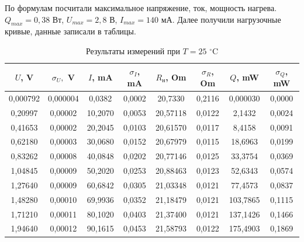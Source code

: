\documentclass[a4paper,12pt]{article}
\begin{document}
По формулам посчитали максимальное напряжение, ток, мощность нагрева. $Q_{max} = 0,38$ Вт, $U_{max} = 2,8$ В, $I_{max} = 140$ мА. Далее получили нагрузочные кривые, данные записали в таблицы.


\begin{table}[H]
    \centering
    \begin{tabular}{|c|c|c|c|c|c|c|c|}
    \hline
        $U$, V & $\sigma_U,$ V & $I$, mA & $\sigma_I$, mA & $R_н$, Om & $\sigma_R$, Om & $Q$, mW & $\sigma_Q$, mW \\ \hline
        0,000792 & 0,000004 & 0,0382 & 0,0002 & 20,7330 & 0,2116 & 0,000030 & 0,0000 \\ \hline
        0,20997 & 0,00002 & 10,2070 & 0,0053 & 20,57118 & 0,0122 & 2,1432 & 0,0024 \\ \hline
        0,41653 & 0,00002 & 20,2045 & 0,0103 & 20,61570 & 0,0117 & 8,4158 & 0,0091 \\ \hline
        0,62180 & 0,00003 & 30,0680 & 0,0152 & 20,67979 & 0,0115 & 18,6963 & 0,0199 \\ \hline
        0,83262 & 0,00008 & 40,0848 & 0,0202 & 20,77146 & 0,0125 & 33,3754 & 0,0369 \\ \hline
        1,04845 & 0,00009 & 50,2020 & 0,0253 & 20,88463 & 0,0123 & 52,6343 & 0,0574 \\ \hline
        1,27640 & 0,00009 & 60,6842 & 0,0305 & 21,03348 & 0,0121 & 77,4573 & 0,0837 \\ \hline
        1,48280 & 0,00010 & 69,9936 & 0,0352 & 21,18479 & 0,0121 & 103,7865 & 0,1115 \\ \hline
        1,71210 & 0,00011 & 80,1020 & 0,0403 & 21,37400 & 0,0121 & 137,1426 & 0,1466 \\ \hline
        1,94640 & 0,00012 & 90,1615 & 0,0453 & 21,58793 & 0,0122 & 175,4903 & 0,1869 \\ \hline
    \end{tabular}
    \caption{Результаты измерений при $T = 25$ $^\circ$C}
\end{table}
\end{document}

